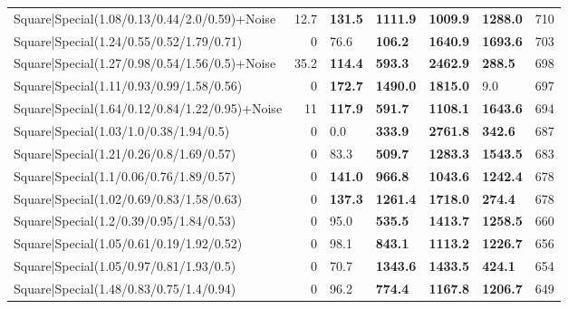 \begin{tabular}{lrllllr}
 Square|Special(1.08/0.13/0.44/2.0/0.59)+Noise                 &            12.7 & \textbf{131.5} & \textbf{1111.9} & \textbf{1009.9} & \textbf{1288.0} &          710 \\
 Square|Special(1.24/0.55/0.52/1.79/0.71)                      &             0   & 76.6           & \textbf{106.2}  & \textbf{1640.9} & \textbf{1693.6} &          703 \\
 Square|Special(1.27/0.98/0.54/1.56/0.5)+Noise                 &            35.2 & \textbf{114.4} & \textbf{593.3}  & \textbf{2462.9} & \textbf{288.5}  &          698 \\
 Square|Special(1.11/0.93/0.99/1.58/0.56)                      &             0   & \textbf{172.7} & \textbf{1490.0} & \textbf{1815.0} & 9.0             &          697 \\
 Square|Special(1.64/0.12/0.84/1.22/0.95)+Noise                &            11   & \textbf{117.9} & \textbf{591.7}  & \textbf{1108.1} & \textbf{1643.6} &          694 \\
 Square|Special(1.03/1.0/0.38/1.94/0.5)                        &             0   & 0.0            & \textbf{333.9}  & \textbf{2761.8} & \textbf{342.6}  &          687 \\
 Square|Special(1.21/0.26/0.8/1.69/0.57)                       &             0   & 83.3           & \textbf{509.7}  & \textbf{1283.3} & \textbf{1543.5} &          683 \\
 Square|Special(1.1/0.06/0.76/1.89/0.57)                       &             0   & \textbf{141.0} & \textbf{966.8}  & \textbf{1043.6} & \textbf{1242.4} &          678 \\
 Square|Special(1.02/0.69/0.83/1.58/0.63)                      &             0   & \textbf{137.3} & \textbf{1261.4} & \textbf{1718.0} & \textbf{274.4}  &          678 \\
 Square|Special(1.2/0.39/0.95/1.84/0.53)                       &             0   & 95.0           & \textbf{535.5}  & \textbf{1413.7} & \textbf{1258.5} &          660 \\
 Square|Special(1.05/0.61/0.19/1.92/0.52)                      &             0   & 98.1           & \textbf{843.1}  & \textbf{1113.2} & \textbf{1226.7} &          656 \\
 Square|Special(1.05/0.97/0.81/1.93/0.5)                       &             0   & 70.7           & \textbf{1343.6} & \textbf{1433.5} & \textbf{424.1}  &          654 \\
 Square|Special(1.48/0.83/0.75/1.4/0.94)                       &             0   & 96.2           & \textbf{774.4}  & \textbf{1167.8} & \textbf{1206.7} &          649 \\

\end{tabular}
